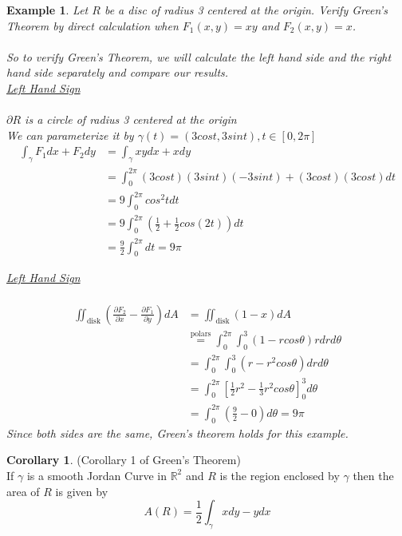 \documentclass[12pt]{article}
\theoremstyle{plain}
\newtheorem{example}[theorem]{Example}
\theoremstyle{definition}
\newtheorem{corollary}[theorem]{Corollary}
\begin{document}
	\begin{example}
		Let $R$ be a disc of radius 3 centered at the origin. Verify Green's Theorem by direct calculation when $F_1 (x,y) =  xy$ and $F_2 (x,y) = x$.\\
		\\
		So to verify Green's Theorem, we will calculate the left hand side and the right hand side separately and compare our results.\\
		\underline{Left Hand Sign}\\
		\\
		$\partial R$ is a circle of radius 3 centered at the origin\\
		We can parameterize it by $\gamma (t) = (3cost, 3sint), t\in [0,2\pi]$
		\begin{align*}
			\int_\gamma F_1 dx + F_2 dy &= \int_\gamma xydx + xdy\\
			&= \int^{2\pi}_0 (3cost)(3sint)(-3sint)+ (3cost)(3cost)dt\\
			&= 9 \int^{2\pi}_0 cos^2 t dt\\
			&= 9 \int^{2\pi}_0 (\frac{1}{2} + \frac{1}{2}cos(2t)) dt\\
			&= \frac{9}{2} \int^{2\pi}_0 dt = 9\pi
		\end{align*}

		\underline{Left Hand Sign}\\
		\\
		\begin{align*}
			\iint_{\text{disk}} (\frac{\partial F_2}{\partial x} - \frac{\partial F_1}{\partial y})dA &= \iint_{\text{disk}} (1-x) dA\\
			&\overset{\text{polars}}{=} \int^{2\pi}_0 \int^3_0 (1-rcos\theta)rdrd\theta\\
			&=\int^{2\pi}_0 \int^3_0 (r-r^2cos\theta)drd\theta\\
			&=\int^{2\pi}_0 [\frac{1}{2}r^2 - \frac{1}{3} r^2 cos\theta]^3_0 d\theta\\
			&=\int^{2\pi}_0 (\frac{9}{2}-0) d\theta = 9\pi
		\end{align*}
		Since both sides are the same, Green's theorem holds for this example.
	\end{example}

	\begin{corollary}
		(Corollary 1 of Green's Theorem)\\
		If $\gamma$ is a smooth Jordan Curve in $\mathbb{R}^2$ and $R$ is the region enclosed by $\gamma$ then the area of $R$ is given by
		$$A(R) = \frac{1}{2} \int_\gamma xdy-ydx$$
	\end{corollary}
\end{document}
